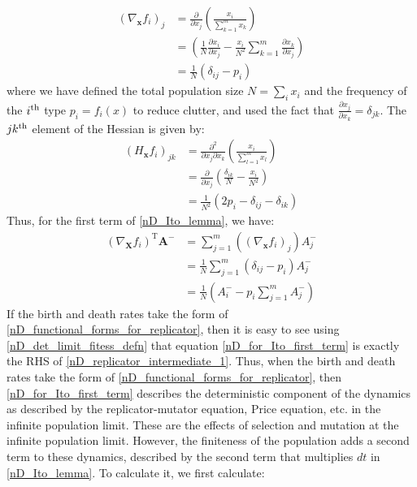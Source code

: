 \begin{align}
\left(\nabla_{\mathbf{x}} f_i\right)_j &= \frac{\partial }{\partial x_j}\left(\frac{x_i}{\sum\limits_{k=1}^{m}x_k}\right)\nonumber\\
&= \left(\frac{1}{N}\frac{\partial x_i}{\partial x_j} 
- \frac{x_i}{N^2}\sum\limits_{k=1}^{m}\frac{\partial x_k}{\partial x_j}\right)\nonumber\\
&= \frac{1}{N}\left(\delta_{ij}-p_i\right)\label{nD_jacobian_for_ito}
\end{align}
where we have defined the total population size $N = \sum_i x_i$ and the frequency of the $i\textsuperscript{th}$ type $p_i = f_i(x)$ to reduce clutter, and used the fact that $\frac{\partial x_j}{\partial x_k} = \delta_{jk}$. The $jk\textsuperscript{th}$ element of the Hessian is given by:
\begin{align}
\left(H_{\mathbf{x}} f_i\right)_{jk} &= \frac{\partial^2 }{\partial x_j \partial x_k}\left( \frac{x_i}{\sum\limits_{l=1}^{m}x_l}\right)\nonumber\\
&= \frac{\partial}{\partial x_j}\left(\frac{\delta_{ik}}{N}-\frac{x_i}{N^2}\right)\nonumber\\
&= \frac{1}{N^2}\left(2p_i - \delta_{ij}-\delta_{ik}\right)\label{nD_hessian_for_ito}
\end{align}
Thus, for the first term of \eqref{nD_Ito_lemma}, we have:
\begin{align}
\left(\nabla_{\mathbf{X}}f_i\right)^{\mathrm{T}}\boldsymbol{\mathbf{A}^{-}} &= \sum\limits_{j=1}^{m}\left(\left(\nabla_{\mathbf{x}} f_i\right)_j\right)A^{-}_{j} \nonumber\\
&= \frac{1}{N}\sum\limits_{j=1}^{m}\left(\delta_{ij}-p_i\right)A^{-}_{j}\nonumber\\
&= \frac{1}{N}\left(A^{-}_{i} - p_i\sum\limits_{j=1}^{m}A^{-}_{j}\right)\label{nD_for_Ito_first_term}
\end{align}
If the birth and death rates take the form of \eqref{nD_functional_forms_for_replicator}, then it is easy to see using \eqref{nD_det_limit_fitess_defn} that equation \eqref{nD_for_Ito_first_term} is exactly the RHS of \eqref{nD_replicator_intermediate_1}. Thus, when the birth and death rates take the form of \eqref{nD_functional_forms_for_replicator}, then \eqref{nD_for_Ito_first_term} describes the deterministic component of the dynamics as described by the replicator-mutator equation, Price equation, etc. in the infinite population limit. These are the effects of selection and mutation at the infinite population limit. However, the finiteness of the population adds a second term to these dynamics, described by the second term that multiplies $dt$ in \eqref{nD_Ito_lemma}. To calculate it, we first calculate:
